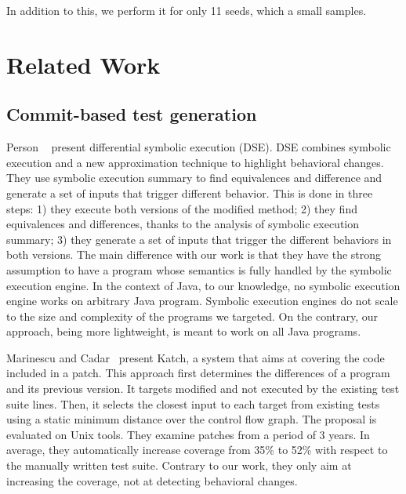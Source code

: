 In addition to this, we perform it for only 11 seeds, which a small samples.

\section{Related Work}
\label{sec:related_work}

\subsection{Commit-based test generation}

Person \etal~\cite{dse} present differential symbolic execution (DSE). DSE combines symbolic execution and a new approximation technique to highlight behavioral changes.
They use symbolic execution summary to find equivalences and difference and generate a set of inputs that trigger different behavior.
This is done in three steps: 1) they execute both versions of the modified method; 2) they find equivalences and differences, thanks to the analysis of symbolic execution summary;  3) they generate a set of inputs that trigger the different behaviors in both versions.
The main difference with our work is that they have the strong assumption to have a program whose semantics is fully handled by the symbolic execution engine. 
In the context of Java, to our knowledge, no symbolic execution engine works on arbitrary Java program.
Symbolic execution engines do not scale to the size and complexity of the programs we targeted.
On the contrary, our approach, being more lightweight, is meant to work on all Java programs.

Marinescu and Cadar~\cite{marinescu2013katch} present Katch, a system that aims at covering the code included in a patch.
This approach first determines the differences of a program and its previous version.
It targets modified and not executed by the existing test suite lines.
Then, it selects the closest input to each target from existing tests using a static minimum distance over the control flow graph.
The proposal is evaluated on Unix tools. 
They examine patches from a period of 3 years. In average, they automatically increase coverage from 35\% to 52\% with respect to the manually written test suite.
Contrary to our work, they only aim at increasing the coverage, not at detecting behavioral changes.

